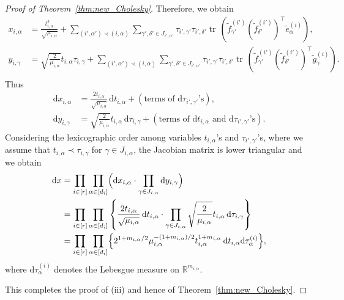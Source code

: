\documentclass[12pt]{amsart}
\theoremstyle{plain}
\theoremstyle{definition}
\theoremstyle{remark}
\newcommand{\R}{\mathbb{R}}
\newcommand{\1}{\mathbf{1}}
\newcommand{\dd}{\mathrm{d}}
\newcommand{\tr}{\operatorname{tr}}
\begin{document}
\begin{proof}[Proof of Theorem~\ref{thm:new_Cholesky}]
Therefore, 
 we obtain
\begin{align*}
x_{i,\alpha} &= \frac{t_{i,\alpha}^2}{\sqrt{\mu_{i,\alpha}}}
+\sum_{(i', \alpha') \prec (i,\alpha) } \sum_{\gamma', \delta' \in J_{i',\alpha'}}
 \tau_{i', \gamma'} \tau_{i', \delta'} 
\tr\, (\tilde{f}^{(i')}_{\gamma'} (\tilde{f}^{(i')}_{\delta'})^\top 
\tilde{e}^{(i)}_\alpha ), \\
y_{i,\gamma} &= \sqrt{ \frac{2}{\mu_{i,\alpha}} } t_{i,\alpha} \tau_{i,\gamma}
+  \sum_{ (i', \alpha') \prec (i,\alpha) } \sum_{\gamma', \delta' \in J_{i',\alpha'}}
 \tau_{i', \gamma'} \tau_{i', \delta'} 
\tr\, (\tilde{f}^{(i')}_{\gamma'} (\tilde{f}^{(i')}_{\delta'})^\top \tilde{g}^{(i)}_\gamma ). \\
\end{align*}
Thus
\begin{align*}
\dd x_{i,\alpha} &= \frac{2 t_{i,\alpha}}{\sqrt{\mu_{i,\alpha} } }\,\dd t_{i,\alpha}
 + (\mbox{terms of $\dd\tau_{i',\gamma'}$'s} ),\\
\dd y_{i,\gamma} &= \sqrt{ \frac{2}{\mu_{i,\alpha}} } t_{i,\alpha}\, \dd\tau_{i,\gamma}
 +  (\mbox{terms of $\dd t_{i,\alpha}$ and $\dd\tau_{i',\gamma'}$'s} ).
\end{align*}
Considering the lexicographic order among variables $t_{i,\alpha}$'s and $\tau_{i',\gamma'}$'s,
 where we assume that $t_{i,\alpha} \prec \tau_{i,\gamma}$ for $\gamma \in J_{i,\alpha}$, 
 the Jacobian matrix is lower triangular and
 we obtain
\begin{equation*}
\begin{aligned}
\dd x 
&= \prod_{i\in[r]} \prod_{\alpha\in[d_i]}
\Bigl(  \dd x_{i,\alpha} \cdot \prod_{\gamma\in J_{i,\alpha}} \dd y_{i,\gamma}\Bigr) \\
&= \prod_{i\in[r]} \prod_{\alpha\in[d_i]} 
\left\{ \frac{2 t_{i,\alpha}}{\sqrt{\mu_{i,\alpha} } }\,\dd t_{i,\alpha}
 \cdot \prod_{\gamma \in J_{i,\alpha} } 
\sqrt{ \frac{2}{\mu_{i,\alpha}} } t_{i,\alpha}\, \dd\tau_{i,\gamma} \right\} \\
&= \prod_{i\in[r]} \prod_{\alpha\in[d_i]}
 \Bigl\{ 
2^{1 + m_{i,\alpha}/2} \mu_{i,\alpha}^{-(1+m_{i,\alpha})/2} t_{i,\alpha}^{1 + m_{i,\alpha}}
 \, \dd t_{i,\alpha} \dd\tau^{(i)}_\alpha
 \Bigr\},
\end{aligned}
\end{equation*}
where $\dd\tau^{(i)}_\alpha$ denotes the Lebesgue measure on $\R^{m_{i,\alpha}}$.

This completes the proof of (iii) and hence of Theorem~\ref{thm:new_Cholesky}.
\end{proof}
\end{document}

